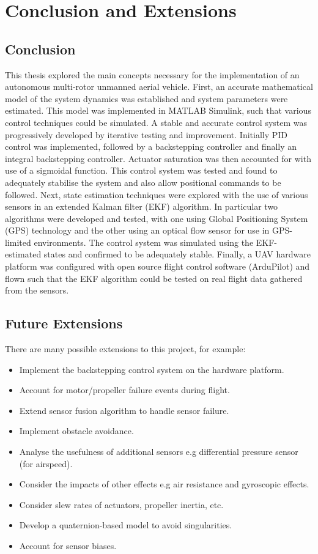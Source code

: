 
\chapter{Conclusion and Extensions}

\section{Conclusion}
This thesis explored the main concepts necessary for the implementation of an autonomous multi-rotor unmanned aerial vehicle. First, an accurate mathematical model of the system dynamics was established and system parameters were estimated. This model was implemented in MATLAB Simulink, such that various control techniques could be simulated. A stable and accurate control system was progressively developed by iterative testing and improvement. Initially PID control was implemented, followed by a backstepping controller and finally an integral backstepping controller. Actuator saturation was then accounted for with use of a sigmoidal function. This control system was tested and found to adequately stabilise the system and also allow positional commands to be followed. Next, state estimation techniques were explored with the use of various sensors in an extended Kalman filter (EKF) algorithm. In particular two algorithms were developed and tested, with one using Global Positioning System (GPS) technology and the other using an optical flow sensor for use in GPS-limited environments. The control system was simulated using the EKF-estimated states and confirmed to be adequately stable. Finally, a UAV hardware platform was configured with open source flight control software (ArduPilot) and flown such that the EKF algorithm could be tested on real flight data gathered from the sensors.

\section{Future Extensions}
There are many possible extensions to this project, for example:

\begin{itemize}
\item Implement the backstepping control system on the hardware platform.
\item Account for motor/propeller failure events during flight.
\item Extend sensor fusion algorithm to handle sensor failure.
\item Implement obstacle avoidance.
\item Analyse the usefulness of additional sensors e.g differential pressure sensor (for airspeed).
\item Consider the impacts of other effects e.g air resistance and gyroscopic effects.
\item Consider slew rates of actuators, propeller inertia, etc.
\item Develop a quaternion-based model to avoid singularities.
\item Account for sensor biases.


\end{itemize}

\clearpage



